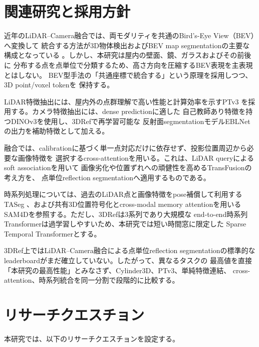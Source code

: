 \documentclass[uplatex,a4paper,11pt]{jsarticle}
\begin{document}
\section{関連研究と採用方針}

近年のLiDAR--Camera融合では、両モダリティを共通のBird's-Eye View（BEV）へ変換して
統合する方法が3D物体検出およびBEV map segmentationの主要な構成となっている
\cite{liu2023_bevfusion}。しかし、本研究は屋内の壁面、鏡、ガラスおよびその前後に
分布する点を点単位で分類するため、高さ方向を圧縮するBEV表現を主表現とはしない。
BEV型手法の「共通座標で統合する」という原理を採用しつつ、3D point/voxel tokenを
保持する。

LiDAR特徴抽出には、屋内外の点群理解で高い性能と計算効率を示すPTv3
\cite{wu2024_ptv3}を採用する。カメラ特徴抽出には、dense predictionに適した
自己教師あり特徴を持つDINOv3\cite{simeoni2025_dinov3}を使用し、3DRefで再学習可能な
反射面segmentationモデルEBLNet\cite{he2021_eblnet}の出力を補助特徴として加える。

融合では、calibrationに基づく単一点対応だけに依存せず、投影位置周辺から必要な画像特徴を
選択するcross-attentionを用いる。これは、LiDAR queryによるsoft associationを用いて
画像劣化や位置ずれへの頑健性を高めるTransFusion\cite{bai2022_transfusion}の考え方を、
点単位reflection segmentationへ適用するものである。

時系列処理については、過去のLiDAR点と画像特徴をpose補償して利用するTASeg
\cite{wu2024_taseg}、および共有3D位置符号化とcross-modal memory attentionを用いる
SAM4D\cite{xu2025_sam4d}を参照する。ただし、3DRefは3系列であり大規模な
end-to-end時系列Transformerは過学習しやすいため、本研究では短い時間窓に限定した
Sparse Temporal Transformerとする。

3DRef上ではLiDAR--Camera融合による点単位reflection segmentationの標準的な
leaderboardがまだ確立していない\cite{zhao2024_3dref}。したがって、異なるタスクの
最高値を直接「本研究の最高性能」とみなさず、Cylinder3D、PTv3、単純特徴連結、
cross-attention、時系列統合を同一分割で段階的に比較する。

\section{リサーチクエスチョン}

本研究では、以下のリサーチクエスチョンを設定する。
\end{document}
